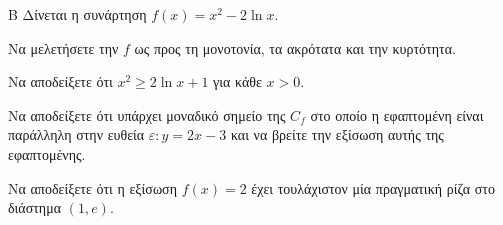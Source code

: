 \begin{thema}{Β}
Δίνεται η συνάρτηση $f(x) = x^2 - 2\ln x$.
\begin{erwthma}
\item Να μελετήσετε την $f$ ως προς τη μονοτονία, τα ακρότατα και την κυρτότητα.
\item Να αποδείξετε ότι $x^2 \ge 2\ln x + 1$ για κάθε $x > 0$.
\item Να αποδείξετε ότι υπάρχει μοναδικό σημείο της $C_f$ στο οποίο η εφαπτομένη είναι παράλληλη στην ευθεία $\varepsilon: y = 2x - 3$ και να βρείτε την εξίσωση αυτής της εφαπτομένης.
\item Να αποδείξετε ότι η εξίσωση $f(x) = 2$ έχει τουλάχιστον μία πραγματική ρίζα στο διάστημα $(1, e)$.
\end{erwthma}
\end{thema}
